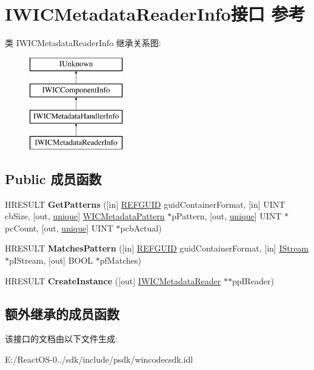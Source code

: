 \hypertarget{interface_i_w_i_c_metadata_reader_info}{}\section{I\+W\+I\+C\+Metadata\+Reader\+Info接口 参考}
\label{interface_i_w_i_c_metadata_reader_info}
类 I\+W\+I\+C\+Metadata\+Reader\+Info 继承关系图\+:\begin{figure}[H]
\begin{center}
\leavevmode
\includegraphics[height=4.000000cm]{interface_i_w_i_c_metadata_reader_info}
\end{center}
\end{figure}
\subsection*{Public 成员函数}
\begin{DoxyCompactItemize}
\item 
\mbox{\label{interface_i_w_i_c_metadata_reader_info_a9650f9487fe7c90583e0db4f220184a9}} 
H\+R\+E\+S\+U\+LT {\bfseries Get\+Patterns} (\mbox{[}in\mbox{]} \hyperlink{struct___g_u_i_d}{R\+E\+F\+G\+U\+ID} guid\+Container\+Format, \mbox{[}in\mbox{]} U\+I\+NT cb\+Size, \mbox{[}out, \hyperlink{interfaceunique}{unique}\mbox{]} \hyperlink{struct_w_i_c_metadata_pattern}{W\+I\+C\+Metadata\+Pattern} $\ast$p\+Pattern, \mbox{[}out, \hyperlink{interfaceunique}{unique}\mbox{]} U\+I\+NT $\ast$pc\+Count, \mbox{[}out, \hyperlink{interfaceunique}{unique}\mbox{]} U\+I\+NT $\ast$pcb\+Actual)
\item 
\mbox{\label{interface_i_w_i_c_metadata_reader_info_a0fc5554e96a1cd6bf000f15f7ff5ee84}} 
H\+R\+E\+S\+U\+LT {\bfseries Matches\+Pattern} (\mbox{[}in\mbox{]} \hyperlink{struct___g_u_i_d}{R\+E\+F\+G\+U\+ID} guid\+Container\+Format, \mbox{[}in\mbox{]} \hyperlink{interface_i_stream}{I\+Stream} $\ast$p\+I\+Stream, \mbox{[}out\mbox{]} B\+O\+OL $\ast$pf\+Matches)
\item 
\mbox{\label{interface_i_w_i_c_metadata_reader_info_adb0a09c07964dfb2484d97e593dad27f}} 
H\+R\+E\+S\+U\+LT {\bfseries Create\+Instance} (\mbox{[}out\mbox{]} \hyperlink{interface_i_w_i_c_metadata_reader}{I\+W\+I\+C\+Metadata\+Reader} $\ast$$\ast$pp\+I\+Reader)
\end{DoxyCompactItemize}
\subsection*{额外继承的成员函数}


该接口的文档由以下文件生成\+:\begin{DoxyCompactItemize}
\item 
E\+:/\+React\+O\+S-\/0../sdk/include/psdk/wincodecsdk.\+idl\end{DoxyCompactItemize}
